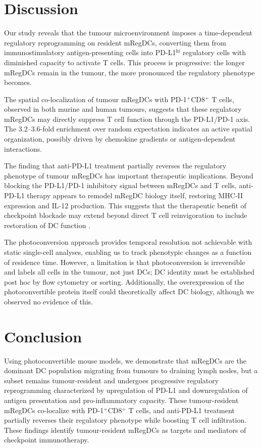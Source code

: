 \documentclass[11pt]{article}
\begin{document}
\section{Discussion}

Our study reveals that the tumour microenvironment imposes a time-dependent regulatory reprogramming on resident mRegDCs, converting them from immunostimulatory antigen-presenting cells into PD-L1$^\text{hi}$ regulatory cells with diminished capacity to activate T cells. This process is progressive: the longer mRegDCs remain in the tumour, the more pronounced the regulatory phenotype becomes.

The spatial co-localization of tumour mRegDCs with PD-1$^+$CD8$^+$ T cells, observed in both murine and human tumours, suggests that these regulatory mRegDCs may directly suppress T cell function through the PD-L1/PD-1 axis. The 3.2--3.6-fold enrichment over random expectation indicates an active spatial organization, possibly driven by chemokine gradients or antigen-dependent interactions.

The finding that anti-PD-L1 treatment partially reverses the regulatory phenotype of tumour mRegDCs has important therapeutic implications. Beyond blocking the PD-L1/PD-1 inhibitory signal between mRegDCs and T cells, anti-PD-L1 therapy appears to remodel mRegDC biology itself, restoring MHC-II expression and IL-12 production. This suggests that the therapeutic benefit of checkpoint blockade may extend beyond direct T cell reinvigoration to include restoration of DC function \citep{garris2018successful}.

The photoconversion approach provides temporal resolution not achievable with static single-cell analyses, enabling us to track phenotypic changes as a function of residence time. However, a limitation is that photoconversion is irreversible and labels all cells in the tumour, not just DCs; DC identity must be established post hoc by flow cytometry or sorting. Additionally, the overexpression of the photoconvertible protein itself could theoretically affect DC biology, although we observed no evidence of this.

\section{Conclusion}

Using photoconvertible mouse models, we demonstrate that mRegDCs are the dominant DC population migrating from tumours to draining lymph nodes, but a subset remains tumour-resident and undergoes progressive regulatory reprogramming characterized by upregulation of PD-L1 and downregulation of antigen presentation and pro-inflammatory capacity. These tumour-resident mRegDCs co-localize with PD-1$^+$CD8$^+$ T cells, and anti-PD-L1 treatment partially reverses their regulatory phenotype while boosting T cell infiltration. These findings identify tumour-resident mRegDCs as targets and mediators of checkpoint immunotherapy.



\end{document}
